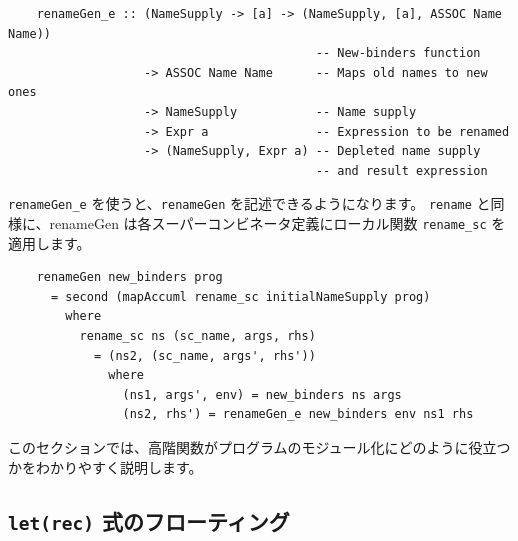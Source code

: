 \documentclass{jbook}
\begin{document}
\begin{verbatim}
	renameGen_e :: (NameSupply -> [a] -> (NameSupply, [a], ASSOC Name Name))
	                                       -- New-binders function
	               -> ASSOC Name Name      -- Maps old names to new ones
	               -> NameSupply           -- Name supply
	               -> Expr a               -- Expression to be renamed
	               -> (NameSupply, Expr a) -- Depleted name supply
	                                       -- and result expression
\end{verbatim}

\texttt{renameGen\_e} を使うと、\texttt{renameGen} を記述できるようになります。
\texttt{rename} と同様に、renameGen は各スーパーコンビネータ定義にローカル関数 \texttt{rename\_sc} を適用します。

\begin{verbatim}
	renameGen new_binders prog
	  = second (mapAccuml rename_sc initialNameSupply prog)
	    where
	      rename_sc ns (sc_name, args, rhs)
	        = (ns2, (sc_name, args', rhs'))
	          where
	            (ns1, args', env) = new_binders ns args
	            (ns2, rhs') = renameGen_e new_binders env ns1 rhs
\end{verbatim}


このセクションでは、高階関数がプログラムのモジュール化にどのように役立つかをわかりやすく説明します。

\subsection{\texttt{let(rec)} 式のフローティング}
\end{document}
